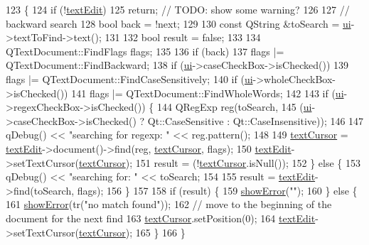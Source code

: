 \begin{DoxyCode}
123                                     \{
124     \textcolor{keywordflow}{if} (!\hyperlink{class_find_replace_form_a6ddb6c32035bcafdd085c457c1ac125c}{textEdit})
125         \textcolor{keywordflow}{return}; \textcolor{comment}{// TODO: show some warning?}
126 
127     \textcolor{comment}{// backward search}
128     \textcolor{keywordtype}{bool} back = !next;
129 
130     \textcolor{keyword}{const} QString &toSearch = \hyperlink{class_find_replace_form_a9bf9e9096feff863dcd6c2a989e07d2c}{ui}->textToFind->text();
131 
132     \textcolor{keywordtype}{bool} result = \textcolor{keyword}{false};
133 
134     QTextDocument::FindFlags flags;
135 
136     \textcolor{keywordflow}{if} (back)
137         flags |= QTextDocument::FindBackward;
138     \textcolor{keywordflow}{if} (\hyperlink{class_find_replace_form_a9bf9e9096feff863dcd6c2a989e07d2c}{ui}->caseCheckBox->isChecked())
139         flags |= QTextDocument::FindCaseSensitively;
140     \textcolor{keywordflow}{if} (\hyperlink{class_find_replace_form_a9bf9e9096feff863dcd6c2a989e07d2c}{ui}->wholeCheckBox->isChecked())
141         flags |= QTextDocument::FindWholeWords;
142 
143     \textcolor{keywordflow}{if} (\hyperlink{class_find_replace_form_a9bf9e9096feff863dcd6c2a989e07d2c}{ui}->regexCheckBox->isChecked()) \{
144         QRegExp reg(toSearch,
145                     (\hyperlink{class_find_replace_form_a9bf9e9096feff863dcd6c2a989e07d2c}{ui}->caseCheckBox->isChecked() ? Qt::CaseSensitive : Qt::CaseInsensitive));
146 
147         qDebug() << \textcolor{stringliteral}{"searching for regexp: "} << reg.pattern();
148 
149         \hyperlink{class_find_replace_form_acbbc970423e9e4dfcee99d53e02d8eb2}{textCursor} = \hyperlink{class_find_replace_form_a6ddb6c32035bcafdd085c457c1ac125c}{textEdit}->document()->find(reg, 
      \hyperlink{class_find_replace_form_acbbc970423e9e4dfcee99d53e02d8eb2}{textCursor}, flags);
150         \hyperlink{class_find_replace_form_a6ddb6c32035bcafdd085c457c1ac125c}{textEdit}->setTextCursor(\hyperlink{class_find_replace_form_acbbc970423e9e4dfcee99d53e02d8eb2}{textCursor});
151         result = (!\hyperlink{class_find_replace_form_acbbc970423e9e4dfcee99d53e02d8eb2}{textCursor}.isNull());
152     \} \textcolor{keywordflow}{else} \{
153         qDebug() << \textcolor{stringliteral}{"searching for: "} << toSearch;
154 
155         result = \hyperlink{class_find_replace_form_a6ddb6c32035bcafdd085c457c1ac125c}{textEdit}->find(toSearch, flags);
156     \}
157 
158     \textcolor{keywordflow}{if} (result) \{
159         \hyperlink{class_find_replace_form_a49bcdfa2193f0fb5fa8ccbbf1875d893}{showError}(\textcolor{stringliteral}{""});
160     \} \textcolor{keywordflow}{else} \{
161         \hyperlink{class_find_replace_form_a49bcdfa2193f0fb5fa8ccbbf1875d893}{showError}(tr(\textcolor{stringliteral}{"no match found"}));
162         \textcolor{comment}{// move to the beginning of the document for the next find}
163         \hyperlink{class_find_replace_form_acbbc970423e9e4dfcee99d53e02d8eb2}{textCursor}.setPosition(0);
164         \hyperlink{class_find_replace_form_a6ddb6c32035bcafdd085c457c1ac125c}{textEdit}->setTextCursor(\hyperlink{class_find_replace_form_acbbc970423e9e4dfcee99d53e02d8eb2}{textCursor});
165     \}
166 \}
\end{DoxyCode}
